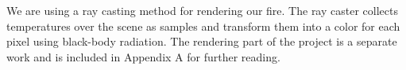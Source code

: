 We are using a ray casting method for rendering our fire. The ray caster collects temperatures over the scene as samples and transform them into a color for each pixel using black-body radiation. The rendering part of the project is a separate work and is included in Appendix A for further reading.
